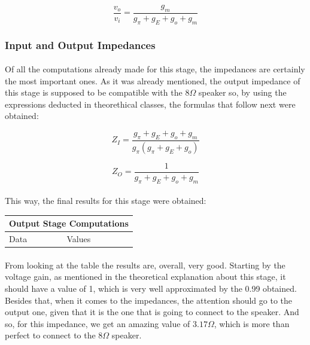 \begin{equation}
    \frac{v_o}{v_i}=\frac{g_m}{g_\pi+g_E+g_o+g_m}
\end{equation}



\subsubsection{Input and Output Impedances}

\paragraph{}Of all the computations already made for this stage, the impedances are certainly the most important ones. As it was already mentioned, the output impedance of this stage is supposed to be compatible with the $8\Omega$ speaker so, by using the expressions deducted in theorethical classes, the formulas that follow next were obtained:

\begin{equation}
    Z_I=\frac{g_\pi+g_E+g_o+g_m}{g_\pi(g_\pi+g_E+g_o)}
\end{equation}

\begin{equation}
    Z_O=\frac{1}{g_\pi+g_E+g_o+g_m}
\end{equation}


\paragraph{}This way, the final results for this stage were obtained:

\begin{table}[H]
\centering
\begin{tabular}{|l|l|} 
\hline
\multicolumn{2}{|l|}{\textbf{Output Stage Computations}}  \\ 
\hline
Data             & Values                               \\ 
\hline
        
\end{tabular}
\end{table}

\paragraph{}From looking at the table the results are, overall, very good. Starting by the voltage gain, as mentioned in the theoretical explanation about this stage, it should have a value of 1, which is very well approximated by the 0.99 obtained. Besides that, when it comes to the impedances, the attention should go to the output one, given that it is the one that is going to connect to the speaker. And so, for this impedance, we get an amazing value of $3.17 \Omega$, which is more than perfect to connect to the $8\Omega$ speaker.





